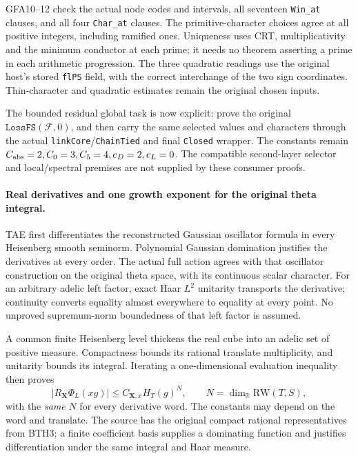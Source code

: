 GFA10--12 check the actual node codes and intervals, all seventeen
\texttt{Win\_at} clauses, and all four \texttt{Char\_at} clauses.
The primitive-character choices agree at all positive integers,
including ramified ones. Uniqueness uses CRT, multiplicativity and
the minimum conductor at each prime; it needs no theorem asserting
a prime in each arithmetic progression. The three quadratic
readings use the original host's stored \texttt{flPS} field, with
the correct interchange of the two sign coordinates. Thin-character
and quadratic estimates remain the original chosen inputs.

The bounded residual global task is now explicit: prove the
original \(\texttt{LossFS}(\mathcal F,0)\), and then carry the
same selected values and characters through the actual
\texttt{linkCore}/\texttt{ChainTied} and final \texttt{Closed}
wrapper. The constants remain
\(C_{\rm abs}=2,C_0=3,C_5=4,e_D=2,e_L=0\).
The compatible second-layer selector and local/spectral premises
are not supplied by these consumer proofs.

\paragraph{Real derivatives and one growth exponent for the original theta integral.}
TAE first differentiates the reconstructed Gaussian oscillator
formula in every Heisenberg smooth seminorm. Polynomial Gaussian
domination justifies the derivatives at every order. The actual
full action agrees with that oscillator construction on the
original theta space, with its continuous scalar character.
For an arbitrary adelic left factor, exact Haar \(L^2\) unitarity
transports the derivative; continuity converts equality almost
everywhere to equality at every point. No unproved supremum-norm
boundedness of that left factor is assumed.

A common finite Heisenberg level thickens the real cube into an
adelic set of positive measure. Compactness bounds its rational
translate multiplicity, and unitarity bounds its integral.
Iterating a one-dimensional evaluation inequality then proves
\[
 |R_{\mathbf X}\Phi_L(xg)|\le C_{\mathbf X,x}
                       H_T(g)^N,
 \qquad N=\dim_{\mathbb R}\mathrm{RW}(T,S),             \tag{AU34.4}
\]
with the \emph{same} \(N\) for every derivative word. The constants
may depend on the word and translate. The source has the original
compact rational representatives from BTH3; a finite coefficient
basis supplies a dominating function and justifies differentiation
under the same integral and Haar measure.

